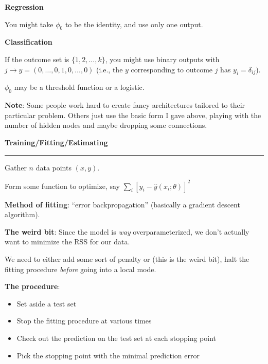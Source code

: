 \documentclass[12pt,letterpaper]{article}
\newcommand{\HRule}{\rule{\linewidth}{4pt}}
\newcommand{\vsphalf}{\vspace*{0.5cm}}
\begin{document}
\vsphalf

\textbf{Regression}

\bigskip

You might take $\phi_0$ to be the identity, and use only one output.

\vsphalf

\textbf{Classification}

\bigskip

If the outcome set is $\{1, 2, \ldots, k\}$, you might use binary
outputs with $j \to y = (0, \ldots, 0, 1, 0, \ldots, 0)$ (i.e., the
$y$ corresponding to outcome $j$ has $y_i = \delta_{ij}$).

\bigskip

$\phi_0$ may be a threshold function or a logistic.

\vsphalf

\textbf{Note}: Some people work hard to create fancy architectures
tailored to their particular problem.  Others just use the basic form
I gave above, playing with the number of hidden nodes and maybe
dropping some connections.

\newpage

\fontsize{30}{30} \selectfont

\centerline{\textbf{Training/Fitting/Estimating}}

\HRule

\vsphalf

\fontsize{20}{25} \selectfont

Gather $n$ data points $(x,y)$. 

\bigskip

Form some function to optimize, say $\sum_i [y_i - \hat{y}(x_i;
\theta)]^2$

\vsphalf

\textbf{Method of fitting}: ``error backpropagation'' (basically a
gradient descent algorithm).

\vsphalf

\textbf{The weird bit}: Since the model is \emph{way\/}
overparameterized, we don't actually want to minimize the RSS for our
data.  

\bigskip

We need to either add some sort of penalty or (this is the weird bit),
halt the fitting procedure \emph{before\/} going into a local mode.  

\bigskip

\textbf{The procedure}: 

\begin{itemize} 
\item Set aside a test set
\item Stop the fitting procedure at various times
\item Check out the prediction on the test set at each stopping point
\item Pick the stopping point with the minimal prediction error
\end{itemize}
\end{document}

